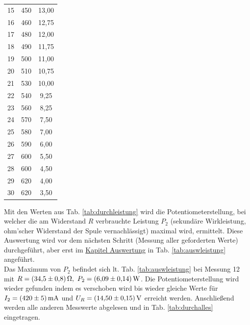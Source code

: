 \documentclass[12pt,a4paper,twoside]{article}
\theoremstyle{definition}
\begin{document}
\begin{table}[H]
\begin{tabular}{| l | *{2}{S|}}
        15      & 450                               & 13,00 \\
        16      & 460                               & 12,75 \\
        17      & 480                               & 12,00 \\
        18      & 490                               & 11,75 \\
        19      & 500                               & 11,00 \\
        20      & 510                               & 10,75 \\
        21      & 530                               & 10,00 \\
        22      & 540                               &  9,25 \\
        23      & 560                               &  8,25 \\
        24      & 570                               &  7,50 \\
        25      & 580                               &  7,00 \\
        26      & 590                               &  6,00 \\
        27      & 600                               &  5,50 \\
        28      & 600                               &  4,50 \\
        29      & 620                               &  4,00 \\
        30      & 620                               &  3,50 \\
        \hline
    \end{tabular}
\end{table}
Mit den Werten aus Tab. \ref{tab:durchleistung} wird die Potentiometerstellung, bei welcher die am Widerstand $R$ verbrauchte Leistung $P_2$ (sekundäre Wirkleistung, ohm'scher Widerstand der Spule vernachlässigt) maximal wird, ermittelt. Diese Auswertung wird vor dem nächsten Schritt (Messung aller geforderten Werte) durchgeführt, aber erst im \hyperref[sec:auswertung]{Kapitel Auswertung} in Tab. \ref{tab:auswleistung} angeführt. \\
Das Maximum von $P_2$ befindet sich lt. Tab. \ref{tab:auswleistung} bei Messung 12 mit $R=\SI{34,5+-0,8}{\ohm}, \ P_2=\SI{6,09+-0,14}{\watt}$. Die Potentiometerstellung wird wieder gefunden indem es verschoben wird bis wieder gleiche Werte für $I_2=\SI{420+-5}{\milli\ampere}$ und $U_R=\SI{14,50+-0,15}{\volt}$ erreicht werden. Anschließend werden alle anderen Messwerte abgelesen und in Tab. \ref{tab:durchalles} eingetragen.
\end{document}
